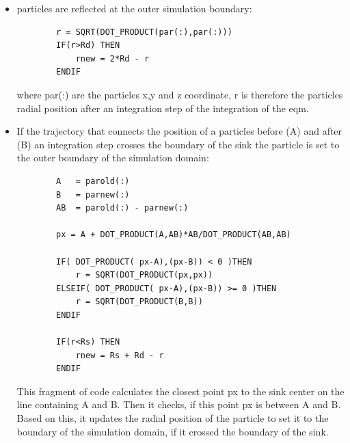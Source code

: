 \begin{itemize}
    \item particles are reflected at the outer simulation boundary:
        \begin{lstlisting}
        r = SQRT(DOT_PRODUCT(par(:),par(:)))
        IF(r>Rd) THEN
            rnew = 2*Rd - r
        ENDIF
        \end{lstlisting}
        where par(:) are the particles x,y and z coordinate, r is therefore the particles radial position after an integration step of the integration of the eqm.
    \item If the trajectory that connects the position of a particles before (A) and after (B) an integration step crosses the boundary of the sink the particle is set to the outer boundary of the simulation domain:
        \begin{lstlisting}
        A   = parold(:)
        B   = parnew(:)
        AB  = parold(:) - parnew(:)

        px = A + DOT_PRODUCT(A,AB)*AB/DOT_PRODUCT(AB,AB)

        IF( DOT_PRODUCT( px-A),(px-B)) < 0 )THEN
            r = SQRT(DOT_PRODUCT(px,px))
        ELSEIF( DOT_PRODUCT( px-A),(px-B)) >= 0 )THEN
            r = SQRT(DOT_PRODUCT(B,B))
        ENDIF
        
        IF(r<Rs) THEN
            rnew = Rs + Rd - r
        ENDIF
        \end{lstlisting}
        This fragment of code calculates the closest point px to the sink center on the line containing A and B. Then it checks, if this point px is between A and B. Based on this, it updates the radial position of the particle to set it to the boundary of the simulation domain, if it crossed the boundary of the sink.
\end{itemize}
